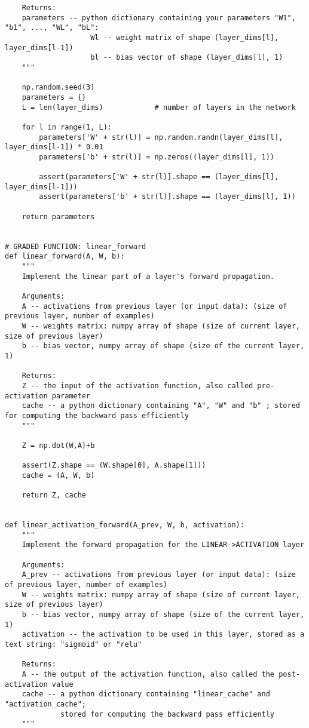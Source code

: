 {\begin{verbatim}
    Returns:
    parameters -- python dictionary containing your parameters "W1", "b1", ..., "WL", "bL":
                    Wl -- weight matrix of shape (layer_dims[l], layer_dims[l-1])
                    bl -- bias vector of shape (layer_dims[l], 1)
    """
    
    np.random.seed(3)
    parameters = {}
    L = len(layer_dims)            # number of layers in the network

    for l in range(1, L):
        parameters['W' + str(l)] = np.random.randn(layer_dims[l], layer_dims[l-1]) * 0.01
        parameters['b' + str(l)] = np.zeros((layer_dims[l], 1))
        
        assert(parameters['W' + str(l)].shape == (layer_dims[l], layer_dims[l-1]))
        assert(parameters['b' + str(l)].shape == (layer_dims[l], 1))
       
    return parameters


# GRADED FUNCTION: linear_forward
def linear_forward(A, W, b):
    """
    Implement the linear part of a layer's forward propagation.

    Arguments:
    A -- activations from previous layer (or input data): (size of previous layer, number of examples)
    W -- weights matrix: numpy array of shape (size of current layer, size of previous layer)
    b -- bias vector, numpy array of shape (size of the current layer, 1)

    Returns:
    Z -- the input of the activation function, also called pre-activation parameter 
    cache -- a python dictionary containing "A", "W" and "b" ; stored for computing the backward pass efficiently
    """
    
    Z = np.dot(W,A)+b
    
    assert(Z.shape == (W.shape[0], A.shape[1]))
    cache = (A, W, b)
    
    return Z, cache


def linear_activation_forward(A_prev, W, b, activation):
    """
    Implement the forward propagation for the LINEAR->ACTIVATION layer

    Arguments:
    A_prev -- activations from previous layer (or input data): (size of previous layer, number of examples)
    W -- weights matrix: numpy array of shape (size of current layer, size of previous layer)
    b -- bias vector, numpy array of shape (size of the current layer, 1)
    activation -- the activation to be used in this layer, stored as a text string: "sigmoid" or "relu"

    Returns:
    A -- the output of the activation function, also called the post-activation value 
    cache -- a python dictionary containing "linear_cache" and "activation_cache";
             stored for computing the backward pass efficiently
    """
    

\end{verbatim}}
